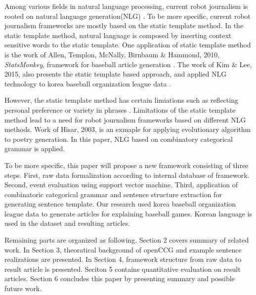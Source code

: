\documentclass[11pt,letterpaper]{article}
\begin{document}
Among various fields in natural language processing, current robot journalism is rooted on natural language generation(NLG) \cite{Konst2015}. To be more specific, current robot journalism frameworks are mostly based on the static template method. In the static template method, natural language is composed by inserting context sensitive words to the static template. One application of static template method is the work of Allen, Templon, McNally, Birnbaum \& Hammond, 2010, \textit{StatsMonkey}, framework for baseball article generation  \cite{Nicholas2010}. The work of Kim \& Lee, 2015, also presents the static template based approach, and applied NLG technology to korea baseball organization league data  \cite{Donghwan2015}. 

However, the static template method has certain limiations such as reflecting personal preference or variety in phrases \cite{Donghwan2015}. Limitations of the static template method lead to a need for robot journalism frameworks based on different NLG methods. Work of Hisar, 2003, is an exmaple for applying evolutionary algorithm to poetry generation. In this paper, NLG based on combinatory categorical grammar is applied. 

To be more specific, this paper will propose a new framework consisting of three steps. First, raw data formalization according to internal database of framework. Second, event evaluation using support vector machine. Third, application of combinatoric categorical grammar and sentence structure extraction for generating sentence template. Our research used korea baseball organization league data to generate articles for explaining baseball games. Korean language is used in the dataset and resulting articles. 

Remaining parts are organized as following. Section 2 covers summary of related work. In Section 3, theoratical background of openCCG and example sentence realizations are presented. In Section 4, framework structure from raw data to result article is presented. Seciton 5 contains quantitative evaluation on result articles. Section 6 concludes this paper by presenting summary and possible future work.  
\end{document}
